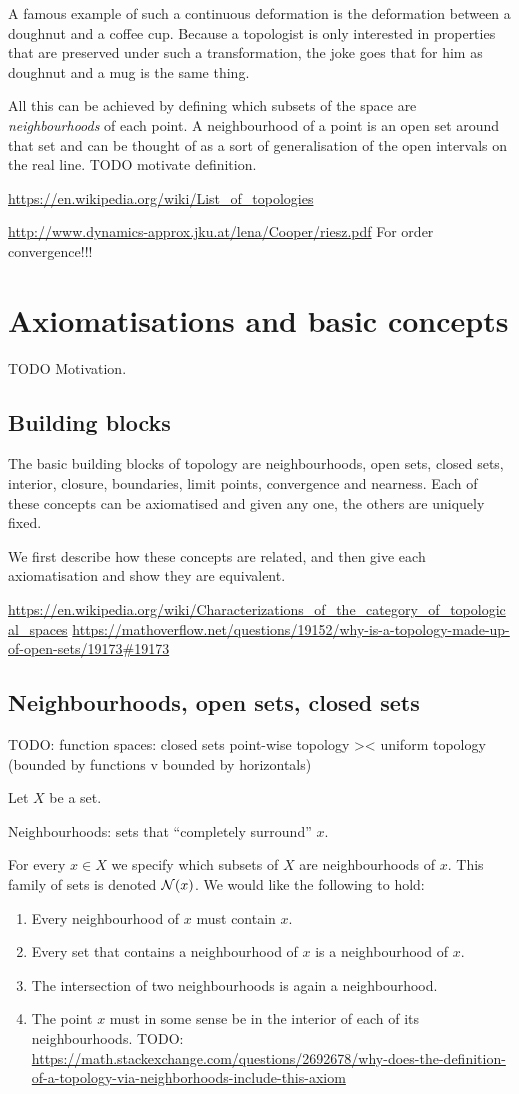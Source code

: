 A famous example of such a continuous deformation is the deformation between a doughnut and a coffee cup. Because a topologist is only interested in properties that are preserved under such a transformation, the joke goes that for him as doughnut and a mug is the same thing.

All this can be achieved by defining which subsets of the space are \textit{neighbourhoods} of each point. A neighbourhood of a point is an open set around that set and can be thought of as a sort of generalisation of the open intervals on the real line. TODO motivate definition.

\url{https://en.wikipedia.org/wiki/List_of_topologies}

\url{http://www.dynamics-approx.jku.at/lena/Cooper/riesz.pdf} For order convergence!!!

\section{Axiomatisations and basic concepts}
TODO Motivation.
\subsection{Building blocks}
The basic building blocks of topology are neighbourhoods, open sets, closed sets, interior, closure, boundaries, limit points, convergence and nearness. Each of these concepts can be axiomatised and given any one, the others are uniquely fixed.

We first describe how these concepts are related, and then give each axiomatisation and show they are equivalent.

\url{https://en.wikipedia.org/wiki/Characterizations_of_the_category_of_topological_spaces} 
\url{https://mathoverflow.net/questions/19152/why-is-a-topology-made-up-of-open-sets/19173#19173}

\subsection{Neighbourhoods, open sets, closed sets}
TODO: function spaces: closed sets point-wise topology >< uniform topology (bounded by functions v bounded by horizontals)

Let $X$ be a set.

Neighbourhoods: sets that ``completely surround'' $x$.

For every $x\in X$ we specify which subsets of $X$ are neighbourhoods of $x$. This family of sets is denoted $\operatorname{\mathcal{N}}(x)$. We would like the following to hold:
\begin{enumerate}
\item Every neighbourhood of $x$ must contain $x$.
\item Every set that contains a neighbourhood of $x$ is a neighbourhood of $x$.
\item The intersection of two neighbourhoods is again a neighbourhood.
\item The point $x$ must in some sense be in the interior of each of its neighbourhoods. TODO: \url{https://math.stackexchange.com/questions/2692678/why-does-the-definition-of-a-topology-via-neighborhoods-include-this-axiom}
\end{enumerate}

